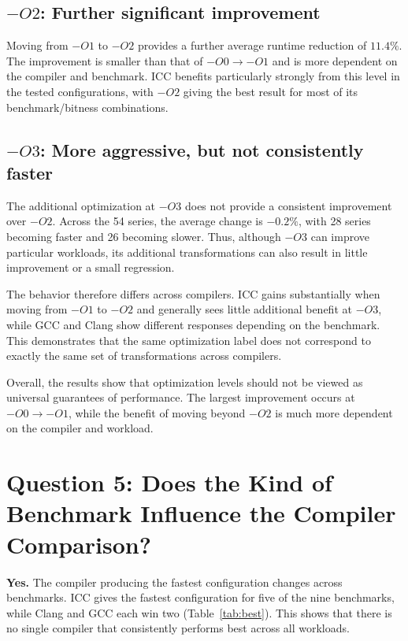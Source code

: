 \documentclass[11pt,a4paper]{article}
\begin{document}
\subsection{$-O2$: Further significant improvement}

Moving from $-O1$ to $-O2$ provides a further average runtime reduction of
$11.4\%$. The improvement is smaller than that of $-O0\rightarrow-O1$ and
is more dependent on the compiler and benchmark. ICC benefits particularly
strongly from this level in the tested configurations, with $-O2$ giving
the best result for most of its benchmark/bitness combinations.

\subsection{$-O3$: More aggressive, but not consistently faster}

The additional optimization at $-O3$ does not provide a consistent
improvement over $-O2$. Across the 54 series, the average change is
$-0.2\%$, with 28 series becoming faster and 26 becoming slower. Thus,
although $-O3$ can improve particular workloads, its additional
transformations can also result in little improvement or a small regression.

The behavior therefore differs across compilers. ICC gains substantially
when moving from $-O1$ to $-O2$ and generally sees little additional benefit
at $-O3$, while GCC and Clang show different responses depending on the
benchmark. This demonstrates that the same optimization label does not
correspond to exactly the same set of transformations across compilers.

Overall, the results show that optimization levels should not be viewed as
universal guarantees of performance. The largest improvement occurs at
$-O0\rightarrow-O1$, while the benefit of moving beyond $-O2$ is much more
dependent on the compiler and workload.

\section{Question 5: Does the Kind of Benchmark Influence the Compiler Comparison?}
\label{sec:q5}

\textbf{Yes.} The compiler producing the fastest configuration changes across
benchmarks. ICC gives the fastest configuration for five of the nine
benchmarks, while Clang and GCC each win two (Table~\ref{tab:best}).
This shows that there is no single compiler that consistently performs best
across all workloads.
\end{document}
